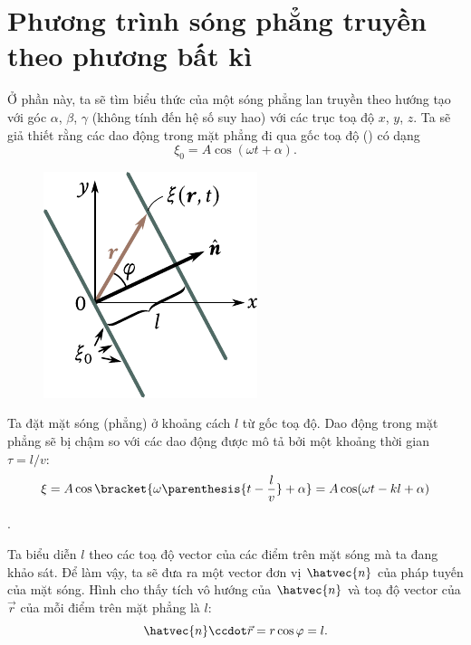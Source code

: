 \section{Phương trình sóng phẳng truyền theo phương bất kì}\label{sec:14_3}

Ở phần này, ta sẽ tìm biểu thức của một sóng phẳng lan truyền theo hướng tạo với góc $\alpha$, $\beta$, $\gamma$ (không tính đến hệ số suy hao) với các trục toạ độ $x$, $y$, $z$. Ta sẽ giả thiết rằng các dao động trong mặt phẳng đi qua gốc toạ độ () có dạng
\begin{equation}\label{eq:14_13}
    \xi_0 = A \cos(\omega t + \alpha).
\end{equation}

\begin{figure}[!htb]
	\begin{center}
		\includegraphics[scale=1]{figures/ch_14/fig_14_5.pdf}
		\caption[]{}
		\label{fig:14_5}
	\end{center}
	\vspace{-0.8cm}
\end{figure}

\noindent
Ta đặt mặt sóng (phẳng) ở khoảng cách $l$ từ gốc toạ độ. Dao động trong mặt phẳng sẽ bị chậm so với các dao động được mô tả bởi  một khoảng thời gian $\tau=l/v$:
\begin{equation}\label{eq:14_14}
    \xi = A \cos\bracket{ \omega \parenthesis{t - \frac{l}{v}} + \alpha} = A \cos(\omega t - kl + \alpha)
\end{equation}

\noindent
[$k = \omega/v$; xem \eqn{14_9}].

Ta biểu diễn $l$ theo các toạ độ vector của các điểm trên mặt sóng mà ta đang khảo sát. Để làm vậy, ta sẽ đưa ra một vector đơn vị $\hatvec{n}$ của pháp tuyến của mặt sóng. Hình  cho thấy tích vô hướng của $\hatvec{n}$ và toạ độ vector của $\vec{r}$ của mỗi điểm trên mặt phẳng là $l$:
\begin{equation*}
    \hatvec{n} \ccdot \vec{r} = r\cos\varphi = l.
\end{equation*}

